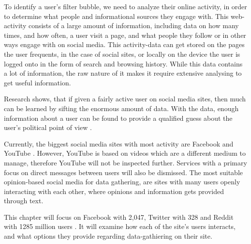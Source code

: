 To identify a user's filter bubble, we need to analyze their online
activity, in order to determine what people and informational sources they
engage with. This web-activity consists of a large amount of information,
including data on how many times, and how often, a user visit a page, and what
people they follow or in other ways engage with on social media.
This activity-data can get stored on the pages the user frequents, in the
case of social sites, or locally on the device the user is logged
onto in the form of search and browsing history. While this data contains a lot
of information, the raw nature of it makes it require extensive analysing
to get useful information.\nl

Research shows, that if given a fairly active user on social media sites, then
much can be learned by sifting the enormous amount of data. With the data, enough
information about a user can be found to provide a qualified guess about the
user's political point of view \citep{Personality}.\nl

Currently, the biggest social media sites with most activity are Facebook and
YouTube \citep{SocialMediaStats}. However, YouTube is based on videos which are
a different medium to manage, therefore YouTube will not be inspected further.
Services with a primary focus on direct messages between users will also be
dismissed. The most suitable opinion-based social media for data gathering, are
sites with many users openly interacting with each other, where opinions and
information gets provided through text.\nl

This chapter will focus on Facebook with 2,047, Twitter with 328 and Reddit with
1285 million users \citep{FacebookPopularity}. It will examine how each of the
site's users interacts, and what options they provide regarding data-gathiering
on their site.
